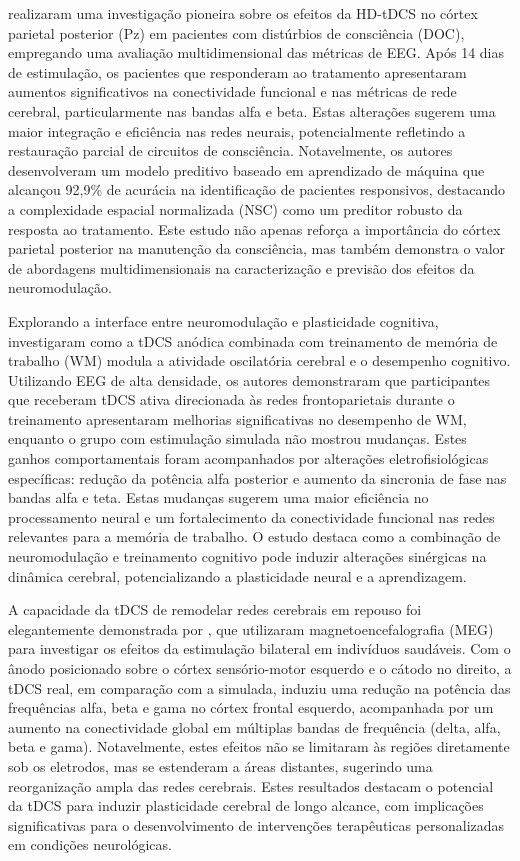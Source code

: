  realizaram uma investigação pioneira sobre os efeitos da HD-tDCS no córtex parietal posterior (Pz) em pacientes com distúrbios de consciência (DOC), empregando uma avaliação multidimensional das métricas de EEG. Após 14 dias de estimulação, os pacientes que responderam ao tratamento apresentaram aumentos significativos na conectividade funcional e nas métricas de rede cerebral, particularmente nas bandas alfa e beta. Estas alterações sugerem uma maior integração e eficiência nas redes neurais, potencialmente refletindo a restauração parcial de circuitos de consciência. Notavelmente, os autores desenvolveram um modelo preditivo baseado em aprendizado de máquina que alcançou 92,9\% de acurácia na identificação de pacientes responsivos, destacando a complexidade espacial normalizada (NSC) como um preditor robusto da resposta ao tratamento. Este estudo não apenas reforça a importância do córtex parietal posterior na manutenção da consciência, mas também demonstra o valor de abordagens multidimensionais na caracterização e previsão dos efeitos da neuromodulação.

Explorando a interface entre neuromodulação e plasticidade cognitiva,  investigaram como a tDCS anódica combinada com treinamento de memória de trabalho (WM) modula a atividade oscilatória cerebral e o desempenho cognitivo. Utilizando EEG de alta densidade, os autores demonstraram que participantes que receberam tDCS ativa direcionada às redes frontoparietais durante o treinamento apresentaram melhorias significativas no desempenho de WM, enquanto o grupo com estimulação simulada não mostrou mudanças. Estes ganhos comportamentais foram acompanhados por alterações eletrofisiológicas específicas: redução da potência alfa posterior e aumento da sincronia de fase nas bandas alfa e teta. Estas mudanças sugerem uma maior eficiência no processamento neural e um fortalecimento da conectividade funcional nas redes relevantes para a memória de trabalho. O estudo destaca como a combinação de neuromodulação e treinamento cognitivo pode induzir alterações sinérgicas na dinâmica cerebral, potencializando a plasticidade neural e a aprendizagem.

A capacidade da tDCS de remodelar redes cerebrais em repouso foi elegantemente demonstrada por , que utilizaram magnetoencefalografia (MEG) para investigar os efeitos da estimulação bilateral em indivíduos saudáveis. Com o ânodo posicionado sobre o córtex sensório-motor esquerdo e o cátodo no direito, a tDCS real, em comparação com a simulada, induziu uma redução na potência das frequências alfa, beta e gama no córtex frontal esquerdo, acompanhada por um aumento na conectividade global em múltiplas bandas de frequência (delta, alfa, beta e gama). Notavelmente, estes efeitos não se limitaram às regiões diretamente sob os eletrodos, mas se estenderam a áreas distantes, sugerindo uma reorganização ampla das redes cerebrais. Estes resultados destacam o potencial da tDCS para induzir plasticidade cerebral de longo alcance, com implicações significativas para o desenvolvimento de intervenções terapêuticas personalizadas em condições neurológicas.


